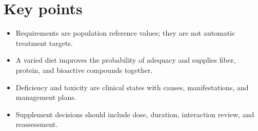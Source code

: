 \section{Key points}
\begin{itemize}
\item Requirements are population reference values; they are not automatic treatment targets.
\item A varied diet improves the probability of adequacy and supplies fiber, protein, and bioactive compounds together.
\item Deficiency and toxicity are clinical states with causes, manifestations, and management plans.
\item Supplement decisions should include dose, duration, interaction review, and reassessment.
\end{itemize}

